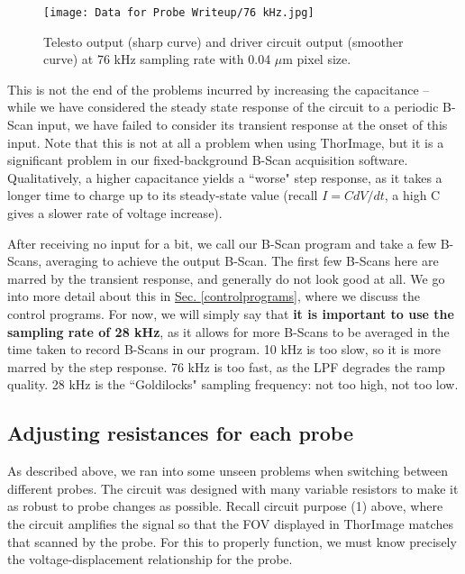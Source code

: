\documentclass{article}
\begin{document}
\begin{figure}[!h]\label{76khz}
	\centering
	\texttt{[image: Data for Probe Writeup/76 kHz.jpg]}
	\caption{Telesto output (sharp curve) and driver circuit output (smoother curve) at 76 kHz sampling rate with 0.04 $\mu$m pixel size.}
\end{figure}

\par{This is not the end of the problems incurred by increasing the capacitance -- while we have considered the steady state response of the circuit to a periodic B-Scan input, we have failed to consider its transient response at the onset of this input. Note that this is not at all a problem when using ThorImage, but it is a significant problem in our fixed-background B-Scan acquisition software. Qualitatively, a higher capacitance yields a ``worse" step response, as it takes a longer time to charge up to its steady-state value (recall $I=C dV/dt$, a high C gives a slower rate of voltage increase).}

\par{After receiving no input for a bit, we call our B-Scan program and take a few B-Scans, averaging to achieve the output B-Scan. The first few B-Scans here are marred by the transient response, and generally do not look good at all. We go into more detail about this in \hyperlink{controlprograms}{Sec. \ref{controlprograms}}, where we discuss the control programs. For now, we will simply say that \textbf{it is important to use the sampling rate of 28 kHz}, as it allows for more B-Scans to be averaged in the time taken to record B-Scans in our program. 10 kHz is too slow, so it is more marred by the step response. 76 kHz is too fast, as the LPF degrades the ramp quality. 28 kHz is the ``Goldilocks" sampling frequency: not too high, not too low.}


\subsection{Adjusting resistances for each probe}

\par{As described above, we ran into some unseen problems when switching between different probes. The circuit was designed with many variable resistors to make it as robust to probe changes as possible. Recall circuit purpose (1) above, where the circuit amplifies the signal so that the FOV displayed in ThorImage matches that scanned by the probe. For this to properly function, we must know precisely the voltage-displacement relationship for the probe.}
\end{document}
